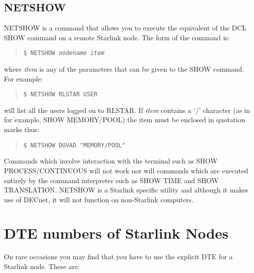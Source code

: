 \subsection{NETSHOW}
NETSHOW is a command that allows you to execute the equivalent of the DCL SHOW
command on a remote Starlink node.
The form of the command is:
\begin{quote}
{\tt \$ NETSHOW {\em nodename item}}
\end{quote}
where {\em item} is any of the parameters that can be given to the SHOW command.
For example:
\begin{quote}
{\tt \$ NETSHOW RLSTAR USER}
\end{quote}
will list all the users logged on to RLSTAR.
If {\em item} contains a `/' character (as in for example, SHOW MEMORY/POOL)
the item must be enclosed in quotation marks thus:
\begin{quote}
{\tt \$ NETSHOW DUVAD "MEMORY/POOL"}
\end{quote}
Commands which involve interaction with the terminal such as SHOW
PROCESS/CONTINUOUS will not work nor will commands which are executed entirely
by the command interpreter such as SHOW TIME and SHOW TRANSLATION.
NETSHOW is a Starlink specific utility and although it makes use of DECnet, it
will not function on non-Starlink computers.

\section{DTE numbers of Starlink Nodes}
\label{sercnames}

On rare occasions you may find that you have to use the explicit DTE for a
Starlink node. These are:

